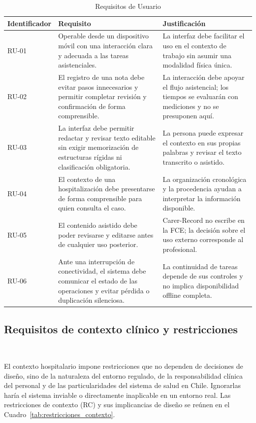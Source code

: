 \begin{table}[H]
\caption{Requisitos de Usuario}
\label{tab:requisitos_usuario}
\begin{tabularx}{\textwidth}{|l|X|X|}
\hline
Identificador & \textbf{Requisito} & \textbf{Justificación} \\
\hline
RU-01 & Operable desde un dispositivo móvil con una interacción clara y adecuada a las tareas asistenciales. & La interfaz debe facilitar el uso en el contexto de trabajo sin asumir una modalidad física única. \\
\hline
RU-02 & El registro de una nota debe evitar pasos innecesarios y permitir completar revisión y confirmación de forma comprensible. & La interacción debe apoyar el flujo asistencial; los tiempos se evaluarán con mediciones y no se presuponen aquí. \\
\hline
RU-03 & La interfaz debe permitir redactar y revisar texto editable sin exigir memorización de estructuras rígidas ni clasificación obligatoria. & La persona puede expresar el contexto en sus propias palabras y revisar el texto transcrito o asistido. \\
\hline
RU-04 & El contexto de una hospitalización debe presentarse de forma comprensible para quien consulta el caso. & La organización cronológica y la procedencia ayudan a interpretar la información disponible. \\
\hline
RU-05 & El contenido asistido debe poder revisarse y editarse antes de cualquier uso posterior. & Carer-Record no escribe en la FCE; la decisión sobre el uso externo corresponde al profesional. \\
\hline
RU-06 & Ante una interrupción de conectividad, el sistema debe comunicar el estado de las operaciones y evitar pérdida o duplicación silenciosa. & La continuidad de tareas depende de sus controles y no implica disponibilidad offline completa. \\
\hline
\end{tabularx}
\end{table}

\subsection*{Requisitos de contexto clínico y restricciones}~

El contexto hospitalario impone restricciones que no dependen de decisiones de diseño, sino de la naturaleza del entorno regulado, de la responsabilidad clínica del personal y de las particularidades del sistema de salud en Chile. Ignorarlas haría el sistema inviable o directamente inaplicable en un entorno real. Las restricciones de contexto (RC) y sus implicancias de diseño se reúnen en el Cuadro~\ref{tab:restricciones_contexto}.

